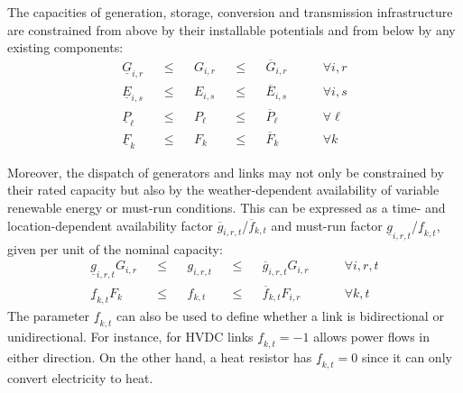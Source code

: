The capacities of generation, storage, conversion and transmission
infrastructure are constrained from above by their installable potentials and
from below by any existing components:
\begin{align}
  \underline{G}_{i,r}  &  & \leq &  & G_{i,r}  &  & \leq &  & \overline{G}_{i,r}  & \qquad\forall i, r \label{eq:genlimit} \\
  \underline{E}_{i,s}  &  & \leq &  & E_{i,s}  &  & \leq &  & \overline{E}_{i,s}  & \qquad\forall i, s \\
  \underline{P}_{\ell} &  & \leq &  & P_{\ell} &  & \leq &  & \overline{P}_{\ell} & \qquad\forall \ell \\
  \underline{F}_{k} &  & \leq &  & F_{k} &  & \leq &  & \overline{F}_{k} & \qquad\forall k
\end{align}

Moreover, the dispatch of generators and links may not only be constrained by their rated capacity but also by the weather-dependent availability of
variable renewable energy or must-run conditions.
This can be expressed as a time- and location-dependent availability
factor $\overline{g}_{i,r,t}$/$\overline{f}_{k,t}$  and must-run factor $\underline{g}_{i,r,t}$/$\underline{f}_{k,t}$, given per unit of the nominal capacity:
\begin{align}
    \underline{g}_{i,r,t}  G_{i,r} &  & \leq &  & g_{i,r,t} &  & \leq &  & \overline{g}_{i,r,t} G_{i,r} & \qquad\forall i, r, t \\
    \underline{f}_{k,t}  F_{k} &  & \leq &  & f_{k,t} &  & \leq &  & \overline{f}_{k,t} F_{i,r} & \qquad\forall k, t
\end{align}
The parameter $\underline{f}_{k,t}$ can also be used to define whether a link is
bidirectional or unidirectional. For instance, for HVDC links
$\underline{f}_{k,t}=-1$ allows power flows in either direction. On the other
hand, a heat resistor has $\underline{f}_{k,t}=0$ since it can only convert
electricity to heat.

